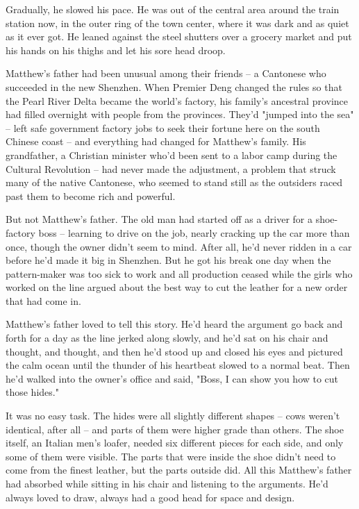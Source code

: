 Gradually, he slowed his pace. He was out of the central area
around the train station now, in the outer ring of the town center,
where it was dark and as quiet as it ever got. He leaned against
the steel shutters over a grocery market and put his hands on his
thighs and let his sore head droop.

Matthew's father had been unusual among their friends -- a
Cantonese who succeeded in the new Shenzhen. When Premier Deng
changed the rules so that the Pearl River Delta became the world's
factory, his family's ancestral province had filled overnight with
people from the provinces. They'd "jumped into the sea" -- left
safe government factory jobs to seek their fortune here on the
south Chinese coast -- and everything had changed for Matthew's
family. His grandfather, a Christian minister who'd been sent to a
labor camp during the Cultural Revolution -- had never made the
adjustment, a problem that struck many of the native Cantonese, who
seemed to stand still as the outsiders raced past them to become
rich and powerful.

But not Matthew's father. The old man had started off as a driver
for a shoe-factory boss -- learning to drive on the job, nearly
cracking up the car more than once, though the owner didn't seem to
mind. After all, he'd never ridden in a car before he'd made it big
in Shenzhen. But he got his break one day when the pattern-maker
was too sick to work and all production ceased while the girls who
worked on the line argued about the best way to cut the leather for
a new order that had come in.

Matthew's father loved to tell this story. He'd heard the argument
go back and forth for a day as the line jerked along slowly, and
he'd sat on his chair and thought, and thought, and then he'd stood
up and closed his eyes and pictured the calm ocean until the
thunder of his heartbeat slowed to a normal beat. Then he'd walked
into the owner's office and said, "Boss, I can show you how to cut
those hides."

It was no easy task. The hides were all slightly different shapes
-- cows weren't identical, after all -- and parts of them were
higher grade than others. The shoe itself, an Italian men's loafer,
needed six different pieces for each side, and only some of them
were visible. The parts that were inside the shoe didn't need to
come from the finest leather, but the parts outside did. All this
Matthew's father had absorbed while sitting in his chair and
listening to the arguments. He'd always loved to draw, always had a
good head for space and design.

